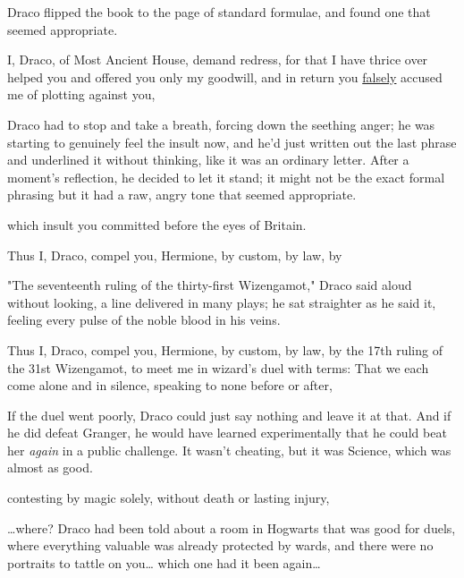 Draco flipped the book to the page of standard formulae, and found one that 
seemed appropriate.

\begin{writtenNote}
I, Draco, of Most Ancient House, demand redress, for that I have thrice 
over helped you and offered you only my goodwill, and in return you 
\underline{falsely} accused me of plotting against you,
\end{writtenNote}

Draco had to stop and take a breath, forcing down the seething anger; he was 
starting to genuinely feel the insult now, and he'd just written out the last 
phrase and underlined it without thinking, like it was an ordinary letter. 
After a moment's reflection, he decided to let it stand; it might not be the 
exact formal phrasing but it had a raw, angry tone that seemed appropriate.

\begin{writtenNote}
which insult you committed before the eyes of Britain.

Thus I, Draco, compel you, Hermione, by custom, by law, by
\end{writtenNote}

"The seventeenth ruling of the thirty-first Wizengamot," Draco said aloud 
without looking, a line delivered in many plays; he sat straighter as he said 
it, feeling every pulse of the noble blood in his veins.

\begin{writtenNote}
Thus I, Draco, compel you, Hermione, by custom, by law, by the 17th 
ruling of the 31st Wizengamot, to meet me in wizard's duel with terms: That we 
each come alone and in silence, speaking to none before or after,
\end{writtenNote}

If the duel went poorly, Draco could just say nothing and leave it at that. And 
if he did defeat Granger, he would have learned experimentally that he could 
beat her \emph{again} in a public challenge. It wasn't cheating, but it was 
Science, which was almost as good.

\begin{writtenNote}
contesting by magic solely, without death or lasting injury,
\end{writtenNote}

{\ldots}where? Draco had been told about a room in Hogwarts that was good for 
duels, where everything valuable was already protected by wards, and there were 
no portraits to tattle on you{\ldots} which one had it been again{\ldots}

